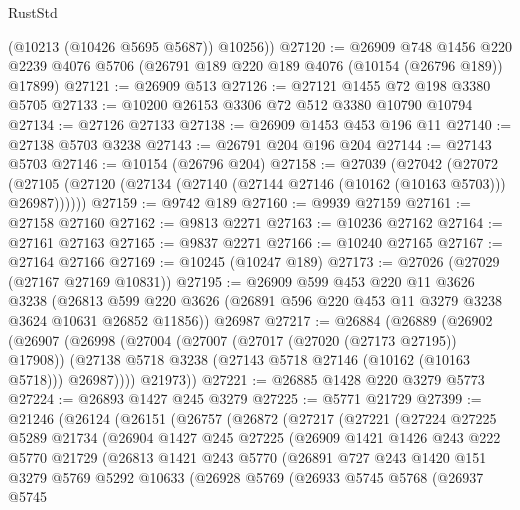 \begin{lexlean}{RustStd}
\begin{coremodule}
        (@10213 (@10426 @5695 @5687))
        @10256))
@27120 := @26909
    @748
    @1456
    @220
    @2239
    @4076
    @5706
    (@26791 @189 @220 @189 @4076 (@10154 (@26796 @189)) @17899)
@27121 := @26909 @513
@27126 := @27121 @1455 @72 @198 @3380 @5705
@27133 := @10200 @26153 @3306 @72 @512 @3380 @10790 @10794
@27134 := @27126 @27133
@27138 := @26909 @1453 @453 @196 @11
@27140 := @27138 @5703 @3238
@27143 := @26791 @204 @196 @204
@27144 := @27143 @5703
@27146 := @10154 (@26796 @204)
@27158 := @27039
    (@27042
      (@27072 (@27105 (@27120 (@27134 (@27140 (@27144 @27146 (@10162 (@10163 @5703))) @26987))))))
@27159 := @9742 @189
@27160 := @9939 @27159
@27161 := @27158 @27160
@27162 := @9813 @2271
@27163 := @10236 @27162
@27164 := @27161 @27163
@27165 := @9837 @2271
@27166 := @10240 @27165
@27167 := @27164 @27166
@27169 := @10245 (@10247 @189)
@27173 := @27026 (@27029 (@27167 @27169 @10831))
@27195 := @26909
    @599
    @453
    @220
    @11
    @3626
    @3238
    (@26813 @599 @220 @3626 (@26891 @596 @220 @453 @11 @3279 @3238 @3624 @10631 @26852 @11856))
    @26987
@27217 := @26884
    (@26889
      (@26902
        (@26907
          (@26998
            (@27004
              (@27007 (@27017 (@27020 (@27173 @27195)) @17908))
              (@27138 @5718 @3238 (@27143 @5718 @27146 (@10162 (@10163 @5718))) @26987))))
        @21973))
@27221 := @26885 @1428 @220 @3279 @5773
@27224 := @26893 @1427 @245 @3279
@27225 := @5771 @21729
@27399 := @21246
    (@26124
      (@26151
        (@26757
          (@26872
            (@27217
              (@27221
                (@27224
                  @27225
                  @5289
                  @21734
                  (@26904
                    @1427
                    @245
                    @27225
                    (@26909
                      @1421
                      @1426
                      @243
                      @222
                      @5770
                      @21729
                      (@26813
                        @1421
                        @243
                        @5770
                        (@26891
                          @727
                          @243
                          @1420
                          @151
                          @3279
                          @5769
                          @5292
                          @10633
                          (@26928
                            @5769
                            (@26933
                              @5745
                              @5768
                              (@26937
                                @5745

\end{coremodule}
\end{lexlean}
